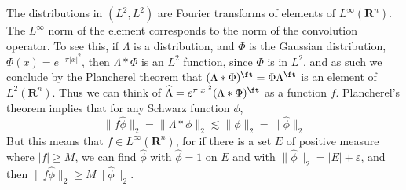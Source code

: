 \begin{example}
	The distributions in $(L^2, L^2)$ are Fourier transforms of elements of $L^\infty(\mathbf{R}^n)$. The $L^\infty$ norm of the element corresponds to the norm of the convolution operator. To see this, if $\Lambda$ is a distribution, and $\Phi$ is the Gaussian distribution, $\Phi(x) = e^{-\pi|x|^2}$, then $\Lambda * \Phi$ is an $L^2$ function, since $\Phi$ is in $L^2$, and as such we conclude by the Plancherel theorem that $(\Lambda * \Phi)^\ft = \Phi \Lambda^\ft$ is an element of $L^2(\mathbf{R}^n)$. Thus we can think of $\widehat{\Lambda} = e^{\pi |x|^2} (\Lambda * \Phi)^\ft$ as a function $f$. Plancherel's theorem implies that for any Schwarz function $\phi$,
	\[ \| f \widehat{\phi} \|_2 = \| \Lambda * \phi \|_2 \lesssim \| \phi \|_2 = \| \widehat{\phi} \|_2 \]
	But this means that $f \in L^\infty(\mathbf{R}^n)$, for if there is a set $E$ of positive measure where $|f| \geq M$, we can find $\widehat{\phi}$ with $\widehat{\phi} = 1$ on $E$ and with $\| \widehat{\phi} \|_2 = |E| + \varepsilon$, and then $\| f \widehat{\phi} \|_2 \geq M \| \widehat{\phi} \|_2$.
\end{example}

